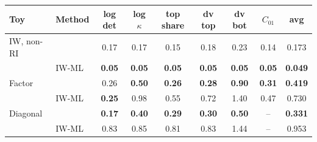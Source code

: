 \begin{tabular}{llccccccc}
    \toprule
    Toy & Method & log det & log $\kappa$ & top share & dv top & dv bot & $C_{01}$ & avg \\
    \midrule
    IW, non-RI & \scsi{} & 0.17 & 0.17 & 0.15 & 0.18 & 0.23 & 0.14 & 0.173 \\
     & IW-ML & \textbf{0.05} & \textbf{0.05} & \textbf{0.05} & \textbf{0.05} & \textbf{0.05} & \textbf{0.05} & \textbf{0.049} \\
    \midrule
    Factor & \scsi{} & 0.26 & \textbf{0.50} & \textbf{0.26} & \textbf{0.28} & \textbf{0.90} & \textbf{0.31} & \textbf{0.419} \\
     & IW-ML & \textbf{0.25} & 0.98 & 0.55 & 0.72 & 1.40 & 0.47 & 0.730 \\
    \midrule
    Diagonal & \scsi{} & \textbf{0.17} & \textbf{0.40} & \textbf{0.29} & \textbf{0.30} & \textbf{0.50} & -- & \textbf{0.331} \\
     & IW-ML & 0.83 & 0.85 & 0.81 & 0.83 & 1.44 & -- & 0.953 \\
    \bottomrule
\end{tabular}
